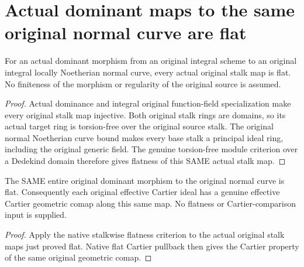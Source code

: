 \section{Actual dominant maps to the same original normal curve are flat}

\begin{theorem}
\label{thm:fc-normal-curve-dominant-stalk-flat}
\leanok
{}
For an actual dominant morphism from an original integral scheme to
an original integral locally Noetherian normal curve, every actual
original stalk map is flat. No finiteness of the morphism or
regularity of the original source is assumed.
\end{theorem}
\begin{proof}
Actual dominance and integral original function-field specialization
make every original stalk map injective. Both original stalk rings
are domains, so its actual target ring is torsion-free over the
original source stalk. The original normal Noetherian curve bound
makes every base stalk a principal ideal ring, including the
original generic field. The genuine torsion-free module criterion
over a Dedekind domain therefore gives flatness of this SAME actual
stalk map.
\end{proof}

\begin{theorem}
\label{thm:fc-normal-curve-dominant-flat}
\leanok
{}
The SAME entire original dominant morphism to the original normal
curve is flat. Consequently each original effective Cartier ideal
has a genuine effective Cartier geometric comap along this same
map. No flatness or Cartier-comparison input is supplied.
\end{theorem}
\begin{proof}
Apply the native stalkwise flatness criterion to the actual original
stalk maps just proved flat. Native flat Cartier pullback then gives
the Cartier property of the same original geometric comap.
\end{proof}
